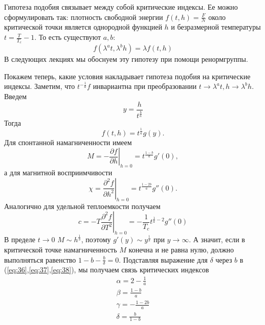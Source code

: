 \documentclass[a4paper,12pt]{article}
\theoremstyle{definition}
\theoremstyle{definition}
\theoremstyle{definition}
\begin{document}
Гипотеза подобия связывает между собой критические индексы. Ее можно сформулировать так: плотность свободной энергии $f(t,h)=\frac{F}{N}$ около критической точки является однородной функцией $h$ и безразмерной температуры $t=\frac{T}{T_c}-1$. То есть существуют $a,b$:
\begin{equation}
  \label{eq:33}
  f(\lambda^a t,\lambda^b h)=\lambda f(t,h)
\end{equation}
В следующих лекциях мы обоснуем эту гипотезу при помощи ренормгруппы.

Покажем теперь, какие условия накладывает гипотеза подобия на критические индексы. Заметим, что $t^{-\frac{1}{a}}f$ инвариантна при преобразовании $t\to \lambda^a t, h\to \lambda^b h$. Введем
\begin{equation}
  \label{eq:34}
  y=\frac{h}{t^{\frac{b}{a}}}
\end{equation}
Тогда
\begin{equation}
  \label{eq:35}
  f(t,h)=t^{\frac{1}{a}}g(y).
\end{equation}
Для спонтанной намагниченности имеем
\begin{equation}
  \label{eq:36}
  M=-\left.\frac{\partial f}{\partial h}\right|_{h=0}=t^{\frac{1-b}{a}}g'(0),
\end{equation}
а для  магнитной восприимчивости
\begin{equation}
  \label{eq:37}
  \chi=\left.\frac{\partial^2 f}{\partial h^2}\right|_{h=0}=t^{\frac{1-2b}{a}}g''(0).
\end{equation}
Аналогично для удельной теплоемкости получаем
\begin{equation}
  \label{eq:38}
  c=-T\left.\frac{\partial^2 f}{\partial T^2}\right|_{h=0}=-\frac{1}{T_c}t^{\frac{1}{a}-2}g''(0)
\end{equation}
В пределе $t\to 0$ $M\sim h^{\frac{1}{\delta}}$, поэтому $g'(y)\sim y^{\frac{1}{\delta}}$ при $y\to \infty$. А значит, если в критической точке намагниченность $M$ конечна и не равна нулю, должно выполняться равенство $1-b-\frac{b}{\delta}=0$. Подставляя выражение для $\delta$ через $b$ в (\ref{eq:36},\ref{eq:37},\ref{eq:38}), мы получаем связь критических индексов
  \begin{eqnarray}
    \label{eq:39}
    \alpha=2-\frac{1}{a}\\
    \beta=\frac{1-b}{a}\\
    \gamma=-\frac{1-2b}{a}\\
    \delta=\frac{b}{1-b}
  \end{eqnarray}
\end{document}
